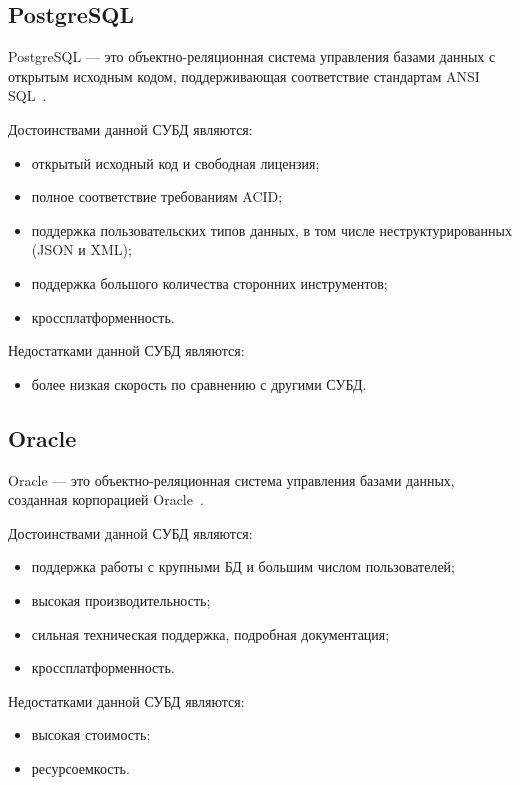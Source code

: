 \subsection{PostgreSQL}

PostgreSQL --- это объектно-реляционная система управления базами данных с
открытым исходным кодом, поддерживающая соответствие стандартам ANSI
SQL~\cite{site08}.

Достоинствами данной СУБД являются:
\begin{itemize}
    \item открытый исходный код и свободная лицензия;
    \item полное соответствие требованиям ACID;
    \item поддержка пользовательских типов данных, в том числе
        неструктурированных (JSON и XML);
    \item поддержка большого количества сторонних инструментов;
    \item кроссплатформенность.
\end{itemize}

Недостатками данной СУБД являются:
\begin{itemize}
    \item более низкая скорость по сравнению с другими СУБД.
\end{itemize}

\subsection{Oracle}

Oracle --- это объектно-реляционная система управления базами данных, созданная
корпорацией Oracle~\cite{site09}.

Достоинствами данной СУБД являются:
\begin{itemize}
    \item поддержка работы с крупными БД и большим числом пользователей;
    \item высокая производительность;
    \item сильная техническая поддержка, подробная документация;
    \item кроссплатформенность.
\end{itemize}

Недостатками данной СУБД являются:
\begin{itemize}
    \item высокая стоимость;
    \item ресурсоемкость.
\end{itemize}

